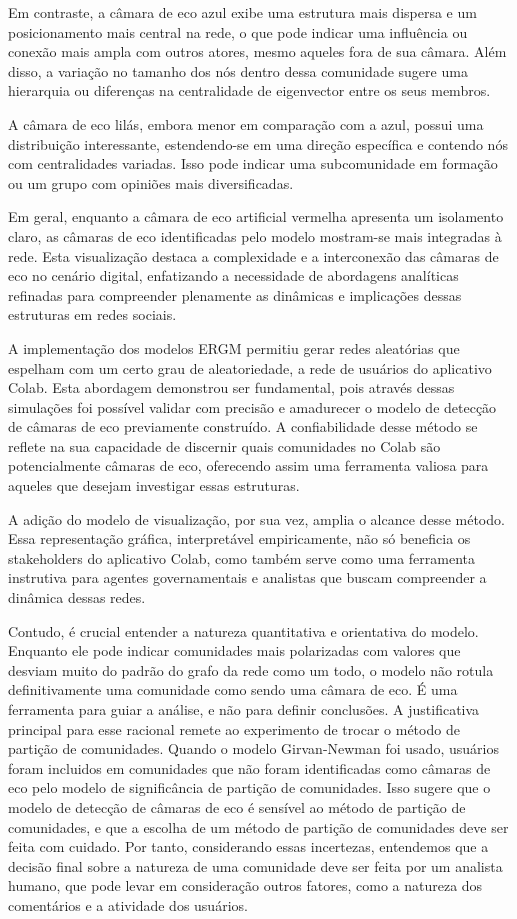 Em contraste, a câmara de eco azul exibe uma estrutura mais dispersa e um posicionamento mais central na rede, o que pode indicar uma influência ou conexão mais ampla com outros atores, mesmo aqueles fora de sua câmara. Além disso, a variação no tamanho dos nós dentro dessa comunidade sugere uma hierarquia ou diferenças na centralidade de eigenvector entre os seus membros.

A câmara de eco lilás, embora menor em comparação com a azul, possui uma distribuição interessante, estendendo-se em uma direção específica e contendo nós com centralidades variadas. Isso pode indicar uma subcomunidade em formação ou um grupo com opiniões mais diversificadas.

Em geral, enquanto a câmara de eco artificial vermelha apresenta um isolamento claro, as câmaras de eco identificadas pelo modelo mostram-se mais integradas à rede. Esta visualização destaca a complexidade e a interconexão das câmaras de eco no cenário digital, enfatizando a necessidade de abordagens analíticas refinadas para compreender plenamente as dinâmicas e implicações dessas estruturas em redes sociais.

A implementação dos modelos ERGM permitiu gerar redes aleatórias que espelham com um certo grau de aleatoriedade, a rede de usuários do aplicativo Colab. Esta abordagem demonstrou ser fundamental, pois através dessas simulações foi possível validar com precisão e amadurecer o modelo de detecção de câmaras de eco previamente construído. A confiabilidade desse método se reflete na sua capacidade de discernir quais comunidades no Colab são potencialmente câmaras de eco, oferecendo assim uma ferramenta valiosa para aqueles que desejam investigar essas estruturas.

A adição do modelo de visualização, por sua vez, amplia o alcance desse método. Essa representação gráfica, interpretável empiricamente, não só beneficia os stakeholders do aplicativo Colab, como também serve como uma ferramenta instrutiva para agentes governamentais e analistas que buscam compreender a dinâmica dessas redes.

Contudo, é crucial entender a natureza quantitativa e orientativa do modelo. Enquanto ele pode indicar comunidades mais polarizadas com valores que desviam muito do padrão do grafo da rede como um todo, o modelo não rotula definitivamente uma comunidade como sendo uma câmara de eco. É uma ferramenta para guiar a análise, e não para definir conclusões. A justificativa principal para esse racional remete ao experimento de trocar o método de partição de comunidades. Quando o modelo Girvan-Newman foi usado, usuários foram incluidos em comunidades que não foram identificadas como câmaras de eco pelo modelo de significância de partição de comunidades. Isso sugere que o modelo de detecção de câmaras de eco é sensível ao método de partição de comunidades, e que a escolha de um método de partição de comunidades deve ser feita com cuidado. Por tanto, considerando essas incertezas, entendemos que a decisão final sobre a natureza de uma comunidade deve ser feita por um analista humano, que pode levar em consideração outros fatores, como a natureza dos comentários e a atividade dos usuários.

